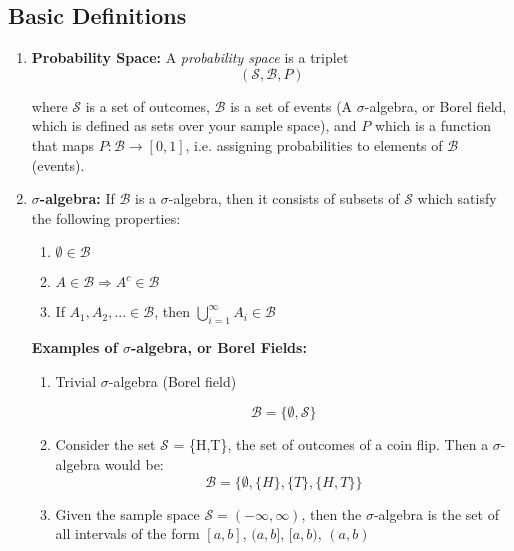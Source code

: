 \documentclass{article}
\begin{document}
\subsection{Basic Definitions}
\begin{enumerate}
    \item \textbf{Probability Space:} A \textit{probability space} is a triplet 
    \begin{equation*}
        (\mathcal{S}, \mathcal{B}, P)
    \end{equation*}
    
    where $\mathcal{S}$ is a set of outcomes, $\mathcal{B}$ is a set of events (A $\sigma$-algebra, or Borel field, which is defined as sets over your sample space), and $P$ which is a function that maps $P:\mathcal{B} \rightarrow [0,1]$, i.e. assigning probabilities to elements of $\mathcal{B}$ (events).
    
    \item \textbf{$\sigma$-algebra:} If $\mathcal{B}$ is a $\sigma$-algebra, then it consists of subsets of $\mathcal{S}$ which satisfy the following properties:
    \begin{enumerate}
        \item $\emptyset \in \mathcal{B}$
        \item $A \in \mathcal{B} \Rightarrow A^c \in \mathcal{B}$
        \item If $A_1, A_2, ... \in \mathcal{B}$, then $\bigcup\limits_{i=1}^{\infty} A_{i} \in \mathcal{B}$
    \end{enumerate}
    
    \textbf{Examples of $\sigma$-algebra, or Borel Fields:}
    \begin{enumerate}
    \item Trivial $\sigma$-algebra (Borel field)
    
    \begin{equation*}
        \mathcal{B} = \{\emptyset, \mathcal{S}\}
    \end{equation*}
    
    \item Consider the set $\mathcal{S}$ = \{H,T\}, the set of outcomes of a coin flip. Then a $\sigma$-algebra would be:
    \begin{equation*}
        \mathcal{B} = \{\emptyset, \{H\}, \{T\}, \{H,T\}\}
    \end{equation*}
    
    \item Given the sample space $\mathcal{S} = (-\infty, \infty)$, then the $\sigma$-algebra is the set of all intervals of the form $[a,b]$, $(a,b]$, $[a,b)$, $(a,b)$
    

\end{enumerate}
\end{enumerate}
\end{document}
